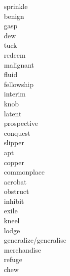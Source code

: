 \documentclass[a4paper, 11pt]{ctexart}
\begin{document}
\begin{multicols*}{3}
\begin{description}
\item[sprinkle]

\item[benign]

\item[gasp]

\item[dew]

\item[tuck]

\item[redeem]

\item[malignant]

\item[fluid]

\item[fellowship]

\item[interim]

\item[knob]

\item[latent]

\item[prospective]

\item[conquest]

\item[slipper]

\item[apt]

\item[copper]

\item[commonplace]

\item[acrobat]

\item[obstruct]

\item[inhibit]

\item[exile]

\item[kneel]

\item[lodge]

\item[generalize/generalise]

\item[merchandise]

\item[refuge]

\item[chew]


\end{description}
\end{multicols*}
\end{document}
